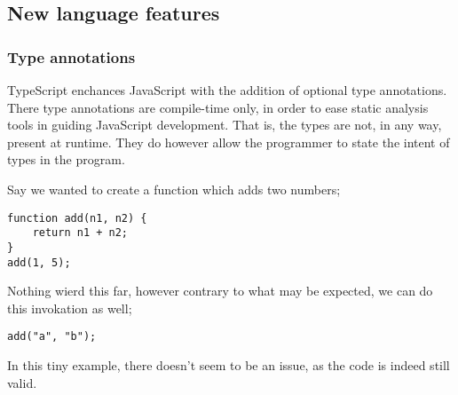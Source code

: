 
\subsection*{New language features}
\subsubsection*{Type annotations}
TypeScript enchances JavaScript with the addition of optional type annotations.
There type annotations are compile-time only, in order to ease static analysis tools in guiding JavaScript development.
That is, the types are not, in any way, present at runtime. They do however allow the programmer to state the intent of types in the program.

Say we wanted to create a function which adds two numbers;
\begin{verbatim}
function add(n1, n2) {
    return n1 + n2;
}
add(1, 5);
\end{verbatim}
Nothing wierd this far, however contrary to what may be expected, we can do this invokation as well;
\begin{verbatim}
add("a", "b");
\end{verbatim}
In this tiny example, there doesn't seem to be an issue, as the code is indeed still valid.

